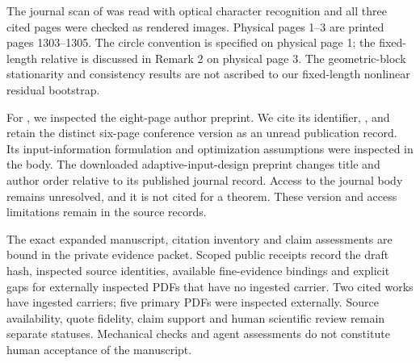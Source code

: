 The journal scan of \citet{politis-1994-stationary} was read with optical character recognition and
all three cited pages were checked as rendered images. Physical pages 1--3 are
printed pages 1303--1305. The circle convention is specified on physical page 1;
the fixed-length relative is discussed in Remark 2 on physical page 3. The
geometric-block stationarity and consistency results are not ascribed to our
fixed-length nonlinear residual bootstrap.

For \citet{manchester-2010-input}, we inspected the eight-page author preprint. We cite its
identifier, , and retain the distinct six-page conference
version as an unread publication record.
Its input-information formulation and optimization assumptions were inspected
in the body. The downloaded adaptive-input-design preprint changes title and
author order relative to its published journal record. Access to the journal
body remains unresolved, and it is not cited for a theorem. These version and
access limitations remain in the source records.

The exact expanded manuscript, citation inventory and claim assessments are
bound in the private evidence packet. Scoped public receipts record the draft
hash, inspected source identities, available fine-evidence bindings and explicit
gaps for externally inspected PDFs that have no ingested carrier. Two cited
works have ingested carriers; five primary PDFs were inspected externally.
Source availability, quote fidelity, claim support and human scientific review
remain separate statuses. Mechanical checks and agent assessments do not
constitute human acceptance of the manuscript.

